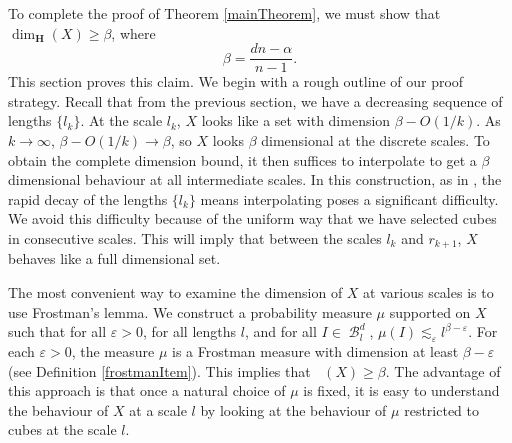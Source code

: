 \documentclass[dvipsnames,letterpaper,12pt]{article}
\numberwithin{equation}{section}
\theoremstyle{plain}
\DeclareMathOperator{\hausdim}{\dim_{\mathbf{H}}}
\DeclareMathOperator{\B}{\mathcal{B}}
\begin{document}
To complete the proof of Theorem \ref{mainTheorem}, we must show that $\dim_{\mathbf{H}}(X) \geq \beta$, where
%
\[ \beta = \frac{dn - \alpha}{n - 1}. \]
%
This section proves this claim. We begin with a rough outline of our proof strategy. Recall that from the previous section, we have a decreasing sequence of lengths $\{ l_k \}$. At the scale $l_k$, $X$ looks like a set with dimension $\beta - O(1/k)$. As $k \to \infty$, $\beta - O(1/k) \to \beta$, so $X$ looks $\beta$ dimensional at the discrete scales. To obtain the complete dimension bound, it then suffices to interpolate to get a $\beta$ dimensional behaviour at all intermediate scales. In this construction, as in \cite{MalabikaRob}, the rapid decay of the lengths $\{ l_k \}$ means interpolating poses a significant difficulty. We avoid this difficulty because of the uniform way that we have selected cubes in consecutive scales. This will imply that between the scales $l_k$ and $r_{k+1}$, $X$ behaves like a full dimensional set.

The most convenient way to examine the dimension of $X$ at various scales is to use Frostman's lemma. We construct a probability measure $\mu$ supported on $X$ such that for all $\varepsilon > 0$, for all lengths $l$, and for all $I \in \B^d_l$, $\mu(I) \lesssim_\varepsilon l^{\beta - \varepsilon}$. For each $\varepsilon > 0$, the measure $\mu$ is a Frostman measure with dimension at least $\beta - \varepsilon$ (see Definition \ref{frostmanItem}). This implies that $\hausdim(X) \geq \beta$. The advantage of this approach is that once a natural choice of $\mu$ is fixed, it is easy to understand the behaviour of $X$ at a scale $l$ by looking at the behaviour of $\mu$ restricted to cubes at the scale $l$.
\end{document}
